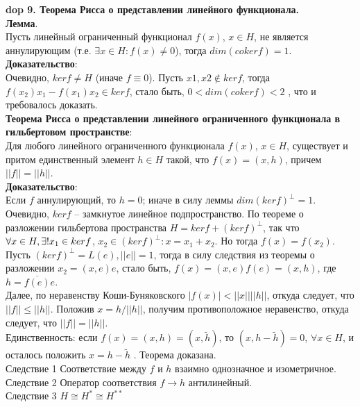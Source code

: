 \setcounter{section}{4}
\setcounter{subsection}{9}
\setcounter{equation}{0}
\textbf{\LARGE dop 9. Теорема Рисса о представлении линейного функционала.}\\


\textbf{Лемма}.\\
Пусть линейный ограниченный функционал $f(x)$, $x \in H$, не является
аннулирующим (т.е. $ \exists x \in H : f(x) \neq 0$), тогда $dim (coker f) = 1$.\\

\textbf{Доказательство}:\\
Очевидно, $ ker f \neq H$ (иначе $f \equiv 0$). Пусть $x1, x2 \not\in ker f$, тогда\\
$f(x_{2})x_{1} - f(x_{1})x_{2} \in ker f$, стало быть, $0 < dim(coker f) < 2$
, что и требовалось доказать.\\

\textbf{Теорема Рисса о представлении линейного ограниченного функционала в
гильбертовом пространстве}:\\
Для любого линейного ограниченного функционала $f(x)$, $x \in H$,
существует и притом единственный элемент $h \in H$ такой, что $f(x)= (x, h)$, причем $||f|| = ||h||$.\\

\textbf{Доказательство}:\\
Если $f$ аннулирующий, то $h = 0$; иначе в силу леммы
$dim(ker f)^{\perp} = 1$. Очевидно, $ker f$ – замкнутое линейное подпространство. По теореме о
разложении гильбертова пространства $H = ker f + (ker f)^{\perp}$, так что $\forall x \in H, \exists! \space x_{1} \in ker f$,
$x_{2} \in (ker f)^{\perp} : x = x_{1} + x_{2}$. Но тогда $f(x) = f(x_{2})$. Пусть $(ker f)^{\perp} = L(e), ||e|| = 1$, тогда в силу следствия из теоремы о разложении $x_{2} = (x, e)e$, стало быть, $f(x) = (x,e)f(e) = (x, h)$, где $h = \overline{f(e)} e$.\\
Далее, по неравенству Коши-Буняковского $|f(x)| < ||x|| ||h||$, откуда следует, что $||f|| \leq ||h||$. Положив $x = h / ||h||$, получим противоположное неравенство, откуда следует, что $||f|| = ||h||$.\\
Единственность: если $f(x) = (x, h) = (x, \tilde h)$, то $(x, h - \tilde h) = 0$, $\forall x \in H$, и осталось положить $x = h - \tilde h$ . Теорема доказана.\\

Следствие 1 Соответствие между $f$ и $h$ взаимно однозначное и изометричное.\\
Следствие 2 Оператор соответствия $f \rightarrow h$ антилинейный.\\
Следствие 3 $H \cong H^{*} \cong H^{**}$

